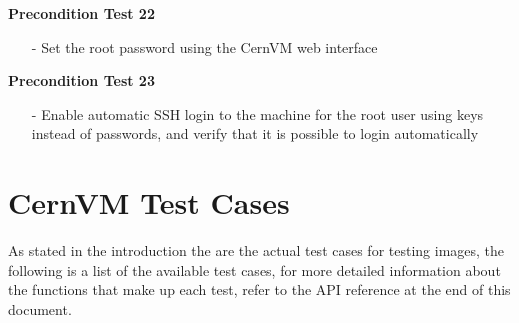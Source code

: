 \begin{description}
\item {\bf	 Precondition Test 22}
		\begin{itemize}
		\item[-]	Set the root password using the CernVM web interface
		\end{itemize}
		
\item {\bf	 Precondition Test 23}
		\begin{itemize}
		\item[-]	Enable automatic SSH login to the machine for the root user using keys
						instead of passwords, and verify that it is possible to login automatically
		\end{itemize}
\end{description}


\section{CernVM Test Cases}
\label{sec:cernvmtestcases}

As stated in the introduction the \testcase are the actual test cases for testing \cernvm
images, the following is a list of the available \cernvm test cases, for more detailed
information about the functions that make up each test, refer to the API reference at 
the end of this document.

